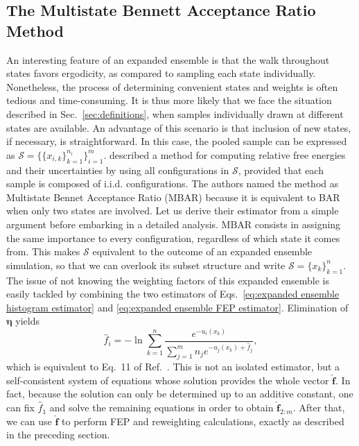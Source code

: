 \documentclass[journal=jctcce,manuscript=article,layout=twocolumn]{achemso}
\newcommand{\vt}[1]{\boldsymbol{\mathbf{#1}}}   %
\begin{document}
\subsection{The Multistate Bennett Acceptance Ratio Method}

An interesting feature of an expanded ensemble is that the walk throughout states favors ergodicity, as compared to sampling each state individually. Nonetheless, the process of determining convenient states and weights is often tedious and time-consuming. It is thus more likely that we face the situation described in Sec.~\ref{sec:definitions}, when samples individually drawn at different states are available. An advantage of this scenario is that inclusion of new states, if necessary, is straightforward. In this case, the pooled sample can be expressed as $\mathcal S = \big\{\{x_{i,k}\}_{k=1}^{n_i} \big\}_{i=1}^m$. \citeauthor{Shirts_2008} \cite{Shirts_2008} described a method for computing relative free energies and their uncertainties by using all configurations in $\mathcal S$, provided that each sample is composed of i.i.d. configurations. The authors named the method as Multistate Bennet Acceptance Ratio (MBAR) because it is equivalent to BAR when only two states are involved. Let us derive their estimator from a simple argument before embarking in a detailed analysis. MBAR consists in assigning the same importance to every configuration, regardless of which state it comes from. This makes $\mathcal S$ equivalent to the outcome of an expanded ensemble simulation, so that we can overlook its subset structure and write $\mathcal S = \{x_k\}_{k=1}^n$. The issue of not knowing the weighting factors of this expanded ensemble is easily tackled by combining the two estimators of Eqs.~\eqref{eq:expanded ensemble histogram estimator} and \eqref{eq:expanded ensemble FEP estimator}. Elimination of $\vt \eta$ yields
\begin{equation}
\label{eq:mbar free energy estimator}
\hat f_i = -\ln \sum_{k=1}^n \frac{e^{-u_i(x_k)}}{\sum_{j=1}^m n_j e^{-u_j(x_k) + \hat f_j}},
\end{equation}
which is equivalent to Eq.~11 of Ref.~. This is not an isolated estimator, but a self-consistent system of equations whose solution provides the whole vector $\hat {\vt f}$. In fact, because the solution can only be determined up to an additive constant, one can fix $\hat f_1$ and solve the remaining equations in order to obtain $\hat{\vt f}_{2:m}$. After that, we can use $\hat{\vt f}$ to perform FEP and reweighting calculations, exactly as described in the preceding section.
\end{document}

